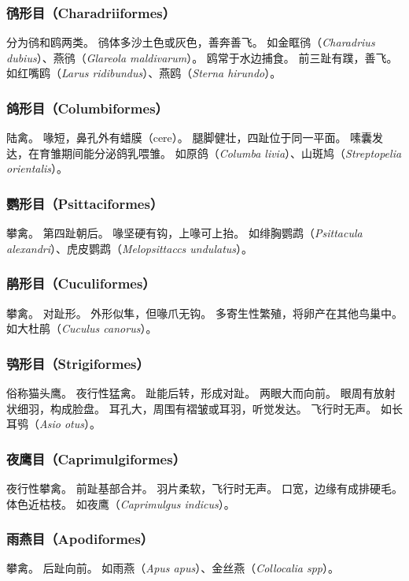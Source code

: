 \documentclass[11pt]{article}
\begin{document}
\subsubsection{鸻形目（Charadriiformes）}
分为鸻和鸥两类。
鸻体多沙土色或灰色，善奔善飞。
如金眶鸻（\textit{Charadrius dubius}）、燕鸻（\textit{Glareola maldivarum}）。
鸥常于水边捕食。
前三趾有蹼，善飞。
如红嘴鸥（\textit{Larus ridibundus}）、燕鸥（\textit{Sterna hirundo}）。

\subsubsection{鸽形目（Columbiformes）}
陆禽。
喙短，鼻孔外有蜡膜（cere）。
腿脚健壮，四趾位于同一平面。
嗉囊发达，在育雏期间能分泌鸽乳喂雏。
如原鸽（\textit{Columba livia}）、山斑鸠（\textit{Streptopelia orientalis}）。

\subsubsection{鹦形目（Psittaciformes）}
攀禽。
第四趾朝后。
喙坚硬有钩，上喙可上抬。
如绯胸鹦鹉（\textit{Psittacula alexandri}）、虎皮鹦鹉（\textit{Melopsittaccs undulatus}）。

\subsubsection{鹃形目（Cuculiformes）}
攀禽。
对趾形。
外形似隼，但喙爪无钩。
多寄生性繁殖，将卵产在其他鸟巢中。
如大杜鹃（\textit{Cuculus canorus}）。

\subsubsection{鸮形目（Strigiformes）}
俗称猫头鹰。
夜行性猛禽。
趾能后转，形成对趾。
两眼大而向前。
眼周有放射状细羽，构成脸盘。
耳孔大，周围有褶皱或耳羽，听觉发达。
飞行时无声。
如长耳鸮（\textit{Asio otus}）。

\subsubsection{夜鹰目（Caprimulgiformes）}
夜行性攀禽。
前趾基部合并。
羽片柔软，飞行时无声。
口宽，边缘有成排硬毛。
体色近枯枝。
如夜鹰（\textit{Caprimulgus indicus}）。

\subsubsection{雨燕目（Apodiformes）}
攀禽。
后趾向前。
如雨燕（\textit{Apus apus}）、金丝燕（\textit{Collocalia spp}）。
\end{document}
